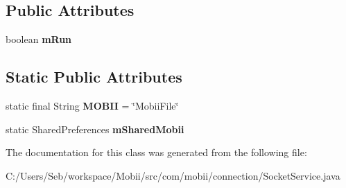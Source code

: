 \subsection*{Public Attributes}
\begin{DoxyCompactItemize}
\item 
\hypertarget{classcom_1_1mobii_1_1connection_1_1_socket_service_ae310a247e2afa7d619457782cac9b4e9}{boolean {\bfseries m\-Run}}\label{classcom_1_1mobii_1_1connection_1_1_socket_service_ae310a247e2afa7d619457782cac9b4e9}

\end{DoxyCompactItemize}
\subsection*{Static Public Attributes}
\begin{DoxyCompactItemize}
\item 
\hypertarget{classcom_1_1mobii_1_1connection_1_1_socket_service_a9a53313a8e95ddf16133b5c629e55fd9}{static final String {\bfseries M\-O\-B\-I\-I} = \char`\"{}Mobii\-File\char`\"{}}\label{classcom_1_1mobii_1_1connection_1_1_socket_service_a9a53313a8e95ddf16133b5c629e55fd9}

\item 
\hypertarget{classcom_1_1mobii_1_1connection_1_1_socket_service_a2a3b45d63db989ea171d2ceca03c0d03}{static Shared\-Preferences {\bfseries m\-Shared\-Mobii}}\label{classcom_1_1mobii_1_1connection_1_1_socket_service_a2a3b45d63db989ea171d2ceca03c0d03}

\end{DoxyCompactItemize}


The documentation for this class was generated from the following file\-:\begin{DoxyCompactItemize}
\item 
C\-:/\-Users/\-Seb/workspace/\-Mobii/src/com/mobii/connection/Socket\-Service.\-java\end{DoxyCompactItemize}
